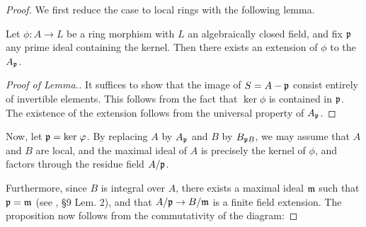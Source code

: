 \begin{proof}
We first reduce the case to local rings with the following lemma.

\begin{lem}
Let $\phi : A \to L$ be a ring morphism with $L$ an algebraically
closed field, and fix $\mathfrak{p}$ any prime ideal containing the
kernel. Then there exists an extension of $\phi$ to the 
$A_{\mathfrak{p}}$.
\end{lem}
\begin{proof}[Proof of Lemma.]
It suffices to show that the image of $S = A - \mathfrak{p}$ consist
entirely of invertible elements. This follows from the fact that
$\ker \phi$ is contained in $\mathfrak{p}$. The existence of the
extension follows from the universal property of $A_{\mathfrak{p}}$.
\end{proof}

Now, let $\mathfrak{p} = \mathrm{ker}\; \varphi$. By replacing $A$ by $A_{\mathfrak{p}}$
and $B$ by $B_{\mathfrak{p}B}$, we may assume that $A$ and $B$ are
local, and the maximal ideal of $A$ is precisely the kernel of $\phi$,
and factors through the residue field $A/\mathfrak{p}$.

Furthermore, since $B$ is integral over $A$, there exists a maximal
ideal $\mathfrak{m}$ such that $\mathfrak{p} = \mathfrak{m}$ (see 
\cite{MatsCA}, \S9 Lem. 2), and that $A/\mathfrak{p} \to B/\mathfrak{m}$ is
a finite field extension. The proposition now follows from the
commutativity of the diagram:
\end{proof}
